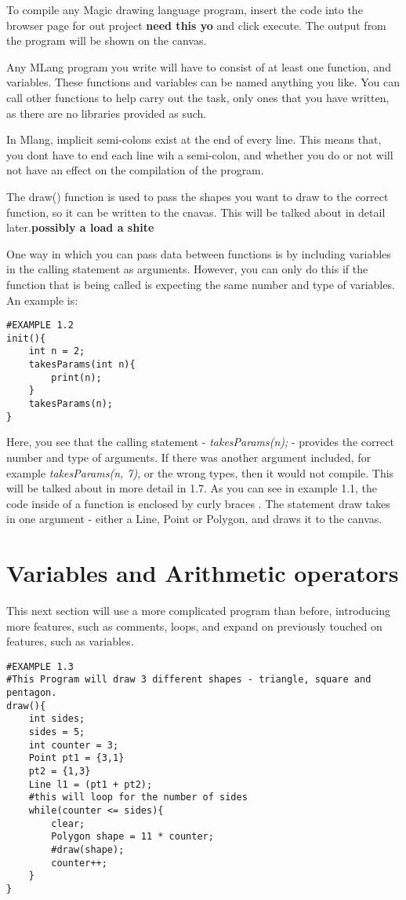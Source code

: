 \documentclass{l3proj}
\begin{document}
To compile any Magic drawing language program, insert the code into the browser page for out project \textbf{need this yo} and click execute. The output from the program will be shown on the canvas.

Any MLang program you write will have to consist of at least one function, and variables. These functions and variables can be named anything you like. You can call other functions to help carry out the task, only ones that you have written, as there are no libraries provided as such. 

In Mlang, implicit semi-colons exist at the end of every line. This means that, you dont have to end each line wih a semi-colon, and whether you do or not will not have an effect on the compilation of the program. 

The draw() function is used to pass the shapes you want to draw to the correct function, so it can be written to the cnavas. This will be talked about in detail later.\textbf{possibly a load a shite}

One way in which you can pass data between functions is by including variables in the calling statement as arguments. However, you can only do this if the function that is being called is expecting the same number and type of variables. An example is:\\
\begin{lstlisting}
#EXAMPLE 1.2
init(){
	int n = 2;
	takesParams(int n){
		print(n);
	}
	takesParams(n);
}
\end{lstlisting}
Here, you see that the calling statement - \textit{takesParams(n);} - provides the correct number and type of arguments. If there was another argument included, for example \textit{takesParams(n, 7)}, or the wrong types, then it would not compile. This will be talked about in more detail in 1.7. As you can see in example 1.1, the code inside of a function is enclosed by curly braces {   }. The statement draw takes in one argument - either a Line, Point or Polygon, and draws it to the canvas.

\section{Variables and Arithmetic operators}
\label{vars}
This next section will use a more complicated program than before, introducing more features, such as comments, loops, and expand on previously touched on features, such as variables.
\begin{lstlisting}
#EXAMPLE 1.3
#This Program will draw 3 different shapes - triangle, square and pentagon.
draw(){
	int sides;
	sides = 5;
	int counter = 3;
	Point pt1 = {3,1}
	pt2 = {1,3}
	Line l1 = (pt1 + pt2);
	#this will loop for the number of sides
	while(counter <= sides){
		clear;
		Polygon shape =	11 * counter;
		#draw(shape);
		counter++;
	}
}
\end{lstlisting}
\end{document}

